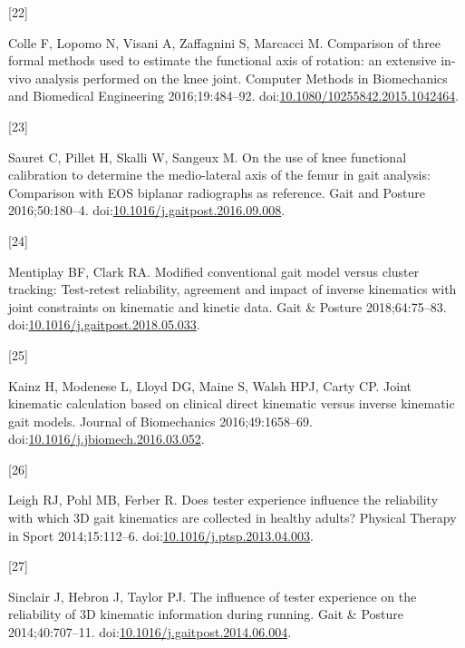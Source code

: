 \documentclass[]{elsarticle} %
\newlength{\cslhangindent}
\newlength{\csllabelwidth}
\newlength{\cslentryspacingunit} %
\newenvironment{CSLReferences}[2] %
 {%
  \setlength{\parindent}{0pt}
  \ifodd #1
  \let\oldpar\par
  \def\par{\hangindent=\cslhangindent\oldpar}
  \fi
  \setlength{\parskip}{#2\cslentryspacingunit}
 }%
 {}
\newcommand{\CSLLeftMargin}[1]{\parbox[t]{\csllabelwidth}{#1}}
\newcommand{\CSLRightInline}[1]{\parbox[t]{\linewidth - \csllabelwidth}{#1}\break}
\begin{document}
\begin{CSLReferences}{0}{0}
\leavevmode{}%
\CSLLeftMargin{{[}22{]} }
\CSLRightInline{Colle F, Lopomo N, Visani A, Zaffagnini S, Marcacci M.
{Comparison of three formal methods used to estimate the functional axis
of rotation: an extensive in-vivo analysis performed on the knee joint}.
Computer Methods in Biomechanics and Biomedical Engineering
2016;19:484--92.
doi:\href{https://doi.org/10.1080/10255842.2015.1042464}{10.1080/10255842.2015.1042464}.}

\leavevmode{}%
\CSLLeftMargin{{[}23{]} }
\CSLRightInline{Sauret C, Pillet H, Skalli W, Sangeux M. {On the use of
knee functional calibration to determine the medio-lateral axis of the
femur in gait analysis: Comparison with EOS biplanar radiographs as
reference}. Gait and Posture 2016;50:180--4.
doi:\href{https://doi.org/10.1016/j.gaitpost.2016.09.008}{10.1016/j.gaitpost.2016.09.008}.}

\leavevmode{}%
\CSLLeftMargin{{[}24{]} }
\CSLRightInline{Mentiplay BF, Clark RA. {Modified conventional gait
model versus cluster tracking: Test-retest reliability, agreement and
impact of inverse kinematics with joint constraints on kinematic and
kinetic data}. Gait \& Posture 2018;64:75--83.
doi:\href{https://doi.org/10.1016/j.gaitpost.2018.05.033}{10.1016/j.gaitpost.2018.05.033}.}

\leavevmode{}%
\CSLLeftMargin{{[}25{]} }
\CSLRightInline{Kainz H, Modenese L, Lloyd DG, Maine S, Walsh HPJ, Carty
CP. {Joint kinematic calculation based on clinical direct kinematic
versus inverse kinematic gait models}. Journal of Biomechanics
2016;49:1658--69.
doi:\href{https://doi.org/10.1016/j.jbiomech.2016.03.052}{10.1016/j.jbiomech.2016.03.052}.}

\leavevmode{}%
\CSLLeftMargin{{[}26{]} }
\CSLRightInline{Leigh RJ, Pohl MB, Ferber R. {Does tester experience
influence the reliability with which 3D gait kinematics are collected in
healthy adults?} Physical Therapy in Sport 2014;15:112--6.
doi:\href{https://doi.org/10.1016/j.ptsp.2013.04.003}{10.1016/j.ptsp.2013.04.003}.}

\leavevmode{}%
\CSLLeftMargin{{[}27{]} }
\CSLRightInline{Sinclair J, Hebron J, Taylor PJ. {The influence of
tester experience on the reliability of 3D kinematic information during
running}. Gait \& Posture 2014;40:707--11.
doi:\href{https://doi.org/10.1016/j.gaitpost.2014.06.004}{10.1016/j.gaitpost.2014.06.004}.}


\end{CSLReferences}
\end{document}
